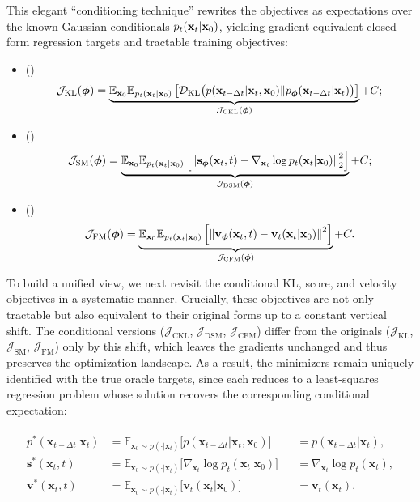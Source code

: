 This elegant ``conditioning technique'' rewrites the objectives as expectations over the known Gaussian conditionals $p_t({\mathbf{x}}_t | {\mathbf{x}}_0)$, yielding gradient-equivalent closed-form regression targets and tractable training objectives:
\begin{itemize}
    \item {} ()\textbfs{:}
    \[
    \mathcal{J}_{\text{KL}}(\bm{\phi}) = \underbrace{\mathbb{E}_{{\mathbf{x}}_0} \mathbb{E}_{p_t({\mathbf{x}}_t|{\mathbf{x}}_0)} \left[
        \mathcal{D}_{\mathrm{KL}}\big(p({\mathbf{x}}_{t-\Delta t}|{\mathbf{x}}_t, {\mathbf{x}}_0) \| p_{\bm{\phi}}({\mathbf{x}}_{t-\Delta t}|{\mathbf{x}}_t)\big)
    \right]}_{\mathcal{J}_{\text{CKL}}(\bm{\phi})} + C;
    \]    
    \item {} ()\textbfs{:}
    \[
    \mathcal{J}_{\text{SM}}(\bm{\phi}) = \underbrace{\mathbb{E}_{{\mathbf{x}}_0} \mathbb{E}_{p_t({\mathbf{x}}_t|{\mathbf{x}}_0)} \left[
        \left\| {\mathbf{s}}_{\bm{\phi}}({\mathbf{x}}_t, t) - \nabla_{{\mathbf{x}}_t} \log p_t({\mathbf{x}}_t | {\mathbf{x}}_0) \right\|_2^2
    \right]}_{\mathcal{J}_{\text{DSM}}(\bm{\phi})} + C;
    \]
    \item {} ()\textbfs{:}
    \[
    \mathcal{J}_{\text{FM}}(\bm{\phi}) = \underbrace{\mathbb{E}_{{\mathbf{x}}_0} \mathbb{E}_{p_t({\mathbf{x}}_t|{\mathbf{x}}_0)} \left[
        \left\| {\mathbf{v}}_{\bm{\phi}}({\mathbf{x}}_t, t) - {\mathbf{v}}_t({\mathbf{x}}_t | {\mathbf{x}}_0) \right\|^2
    \right]}_{\mathcal{J}_{\text{CFM}}(\bm{\phi})} + C.
    \]
\end{itemize}
To build a unified view, we next revisit the conditional KL, score, and velocity objectives in a systematic manner. Crucially, these objectives are not only tractable but also equivalent to their original forms up to a constant vertical shift. 
The conditional versions ($\mathcal{J}_{\text{CKL}}$, $\mathcal{J}_{\text{DSM}}$, $\mathcal{J}_{\text{CFM}}$) differ from the originals ($\mathcal{J}_{\text{KL}}$, $\mathcal{J}_{\text{SM}}$, $\mathcal{J}_{\text{FM}}$) only by this shift, which leaves the gradients unchanged and thus preserves the optimization landscape. 
As a result, the minimizers remain uniquely identified with the true oracle targets, since each reduces to a least-squares regression problem whose solution recovers the corresponding conditional expectation:
\begin{mdframed}
    \begin{align}\label{eq:three-minimizer-oracle}
\begin{aligned}
        p^*(\mathbf{x}_{t-\Delta t}|\mathbf{x}_t) &= \mathbb{E}_{\mathbf{x}_0 \sim p(\cdot|\mathbf{x}_t)} \big[p(\mathbf{x}_{t-\Delta t}|\mathbf{x}_t, \mathbf{x}_0)\big] &&= p(\mathbf{x}_{t-\Delta t}|\mathbf{x}_t), \\
    \mathbf{s}^*(\mathbf{x}_t, t) &= \mathbb{E}_{\mathbf{x}_0 \sim p(\cdot|\mathbf{x}_t)} \big[\nabla_{\mathbf{x}_t} \log p_t(\mathbf{x}_t|\mathbf{x}_0)\big] &&= \nabla_{\mathbf{x}_t} \log p_t(\mathbf{x}_t), \\
    \mathbf{v}^*(\mathbf{x}_t, t) &= \mathbb{E}_{\mathbf{x}_0 \sim p(\cdot|\mathbf{x}_t)} \big[\mathbf{v}_t(\mathbf{x}_t|\mathbf{x}_0)\big] &&= \mathbf{v}_t(\mathbf{x}_t).
\end{aligned}
\end{align}
\end{mdframed}


